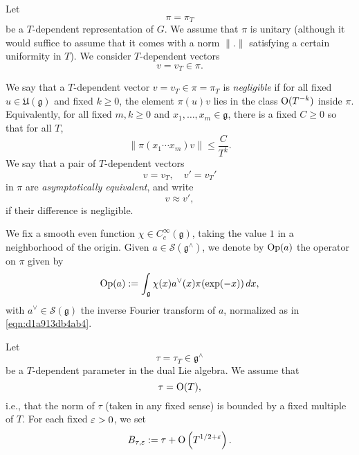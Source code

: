 \documentclass[reqno]{amsart} 
\numberwithin{equation}{section}
\begin{document}
Let
\begin{equation*}
  \pi = \pi_T
\end{equation*}
be a $T$-dependent representation of $G$.  We assume that $\pi$ is unitary (although it would suffice to assume that it comes with a norm $\lVert . \rVert$ satisfying a certain uniformity in $T$).  We consider $T$-dependent vectors
\begin{equation*}
  v = v_T \in \pi.
\end{equation*}
\begin{definition}
  We say that a $T$-dependent vector $v = v_T \in \pi = \pi_T$ is \emph{negligible} if for all fixed $u \in \mathfrak{U}(\mathfrak{g})$ and fixed $k \geq 0$, the element $\pi(u) v$ lies in the class $\operatorname{O}(T^{-k})$ inside $\pi$.  Equivalently, for all fixed $m, k \geq 0$ and $x_1,\dotsc,x_m \in \mathfrak{g}$, there is a fixed $C \geq 0$ so that for all $T$,
  \begin{equation*}
    \lVert
    \pi (x_1 \dotsb x_m ) v
    \rVert
    \leq
    \frac{C}{ T^k }.
  \end{equation*}
  We say that a pair of $T$-dependent vectors
  \begin{equation*}
    v = v _T, \quad
    v' = v_T'
  \end{equation*}
  in $\pi$ are \emph{asymptotically equivalent}, and write
  \begin{equation*}
    v \approx v ',
  \end{equation*}
  if their difference is negligible.
\end{definition}

\begin{definition}
  We fix a smooth even function $\chi \in C_c^\infty(\mathfrak{g})$, taking the value $1$ in a neighborhood of the origin.  Given $a \in \mathcal{S}(\mathfrak{g}^\wedge)$, we denote by $\operatorname{Op}(a)$ the operator on $\pi$ given by
  \begin{equation*}
    \operatorname{Op}(a) := \int_{\mathfrak{g} } \chi(x) a^\vee (x) \pi (\exp(-x)) \, d x,
  \end{equation*}
  with $a^\vee \in \mathcal{S}(\mathfrak{g})$ the inverse Fourier transform of $a$, normalized as in \eqref{eqn:d1a913db4ab4}.
\end{definition}


Let
\begin{equation*}
  \tau = \tau_T \in \mathfrak{g}^\wedge
\end{equation*}
be a $T$-dependent parameter in the dual Lie algebra.  We assume that
\begin{equation*}
  \tau = \operatorname{O}(T),
\end{equation*}
i.e., that the norm of $\tau$ (taken in any fixed sense) is bounded by a fixed multiple of $T$.  For each fixed $\varepsilon > 0$, we set
\begin{equation}\label{eqn:d1a8de18355b}
  B_{\tau,\varepsilon} := \tau + \operatorname{O} \left( T^{1/2 + \varepsilon } \right).
\end{equation}
\end{document}
